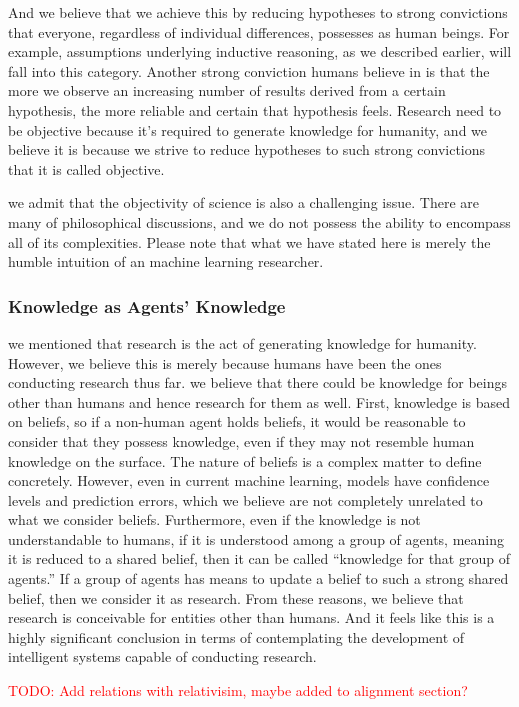 \documentclass{book}
\begin{document}
And we believe that we achieve this by reducing hypotheses to strong convictions that everyone, regardless of individual differences, possesses as human beings. For example, assumptions underlying inductive reasoning, as we described earlier, will fall into this category. Another strong conviction humans believe in is that the more we observe an increasing number of results derived from a certain hypothesis, the more reliable and certain that hypothesis feels. Research need to be objective because it's required to generate knowledge for humanity, and we believe it is because we strive to reduce hypotheses to such strong convictions that it is called objective. 

we admit that the objectivity of science is also a challenging issue. There are many of philosophical discussions, and we do not possess the ability to encompass all of its complexities. Please note that what we have stated here is merely the humble intuition of an machine learning researcher.

\subsubsection{Knowledge as Agents' Knowledge}
we mentioned that research is the act of generating knowledge for humanity. However, we believe this is merely because humans have been the ones conducting research thus far. we believe that there could be knowledge for beings other than humans and hence research for them as well. First, knowledge is based on beliefs, so if a non-human agent holds beliefs, it would be reasonable to consider that they possess knowledge, even if they may not resemble human knowledge on the surface. The nature of beliefs is a complex matter to define concretely. However, even in current machine learning, models have confidence levels and prediction errors, which we believe are not completely unrelated to what we consider beliefs. Furthermore, even if the knowledge is not understandable to humans, if it is understood among a group of agents, meaning it is reduced to a shared belief, then it can be called ``knowledge for that group of agents.'' If a group of agents has means to update a belief to such a strong shared belief, then we consider it as research. From these reasons, we believe that research is conceivable for entities other than humans. And it feels like this is a highly significant conclusion in terms of contemplating the development of intelligent systems capable of conducting research.

\textcolor{red}{TODO: Add relations with relativisim, maybe added to alignment section?}
\end{document}
